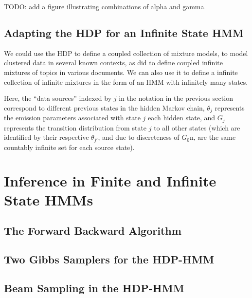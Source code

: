 TODO: add a figure illustrating combinations of alpha and gamma

\subsection{Adapting the HDP for an Infinite State HMM}

We could use the HDP to define a coupled collection of mixture models,
to model clustered data in several known contexts, as
\citet{teh2006hierarchical} did to define coupled infinite mixtures of
topics in various documents.  We can also use it to define a infinite
collection of infinite mixtures in the form of an HMM with infinitely
many states.

Here, the ``data sources'' indexed by $j$ in the notation in the
previous section correspond to different previous states in the hidden
Markov chain, $\theta_j$ represents the emission parameters
associated with state $j$ each hidden state, and $G_j$ represents the
transition distribution from state $j$ to all other states (which are
identified by their respective $\theta_{j'}$, and due to discreteness
of $G_0$n, are the same countably infinite set for each source state).

\section{Inference in Finite and Infinite State HMMs}
\label{sec:inference-hdp-hmm}

\subsection{The Forward Backward Algorithm}
\label{sec:forw-backw-algor-1}

\subsection{Two Gibbs Samplers for the HDP-HMM}

\subsection{Beam Sampling in the HDP-HMM}
